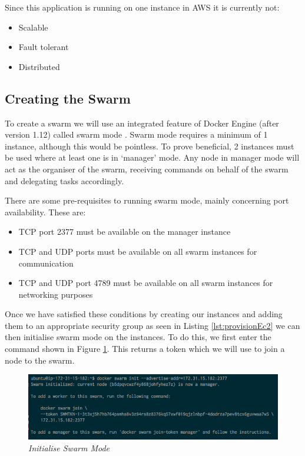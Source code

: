 \documentclass{article}
\begin{document}
Since this application is running on one instance in AWS it is currently not:

\begin{itemize}
  \item Scalable
  \item Fault tolerant
  \item Distributed
\end{itemize}

\newpage
\subsection{Creating the Swarm}
\label{subs:creating_swarm}
To create a swarm we will use an integrated feature of Docker Engine (after version 1.12) called swarm mode \citep{SwarmEngine2016}. Swarm mode requires a minimum of 1 instance, although this would be pointless. To prove beneficial, 2 instances must be used where at least one is in `manager' mode. Any node in manager mode will act as the organiser of the swarm, receiving commands on behalf of the swarm and delegating tasks accordingly.

There are some pre-requisites to running swarm mode, mainly concerning port availability. These are:

\begin{itemize}
  \item TCP port 2377 must be available on the manager instance
  \item TCP and UDP ports must be available on all swarm instances for communication
  \item TCP and UDP port 4789 must be available on all swarm instances for networking purposes
\end{itemize}

Once we have satisfied these conditions by creating our instances and adding them to an appropriate security group as seen in Listing \ref{lst:provisionEc2} we can then initialise swarm mode on the instances. To do this, we first enter the command shown in Figure \ref{fig:swarm_init}. This returns a token which we will use to join a node to the swarm.

\begin{figure}[!h]
\centering
\includegraphics*[width=\textwidth]{components/images/swarm_init}
\caption{\em Initialise Swarm Mode}
\label{fig:swarm_init}
\end{figure}
\end{document}
